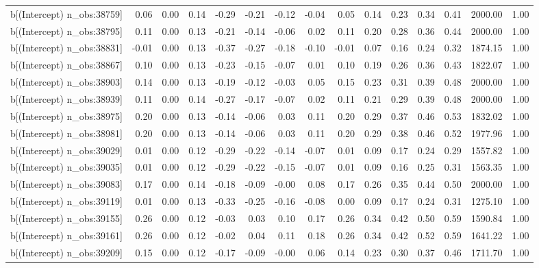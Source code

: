 \begin{table}[ht]
\begin{tabular}{rrrrrrrrrrrrrrr}
  b[(Intercept) n\_obs:38759] & 0.06 & 0.00 & 0.14 & -0.29 & -0.21 & -0.12 & -0.04 & 0.05 & 0.14 & 0.23 & 0.34 & 0.41 & 2000.00 & 1.00 \\ 
  b[(Intercept) n\_obs:38795] & 0.11 & 0.00 & 0.13 & -0.21 & -0.14 & -0.06 & 0.02 & 0.11 & 0.20 & 0.28 & 0.36 & 0.44 & 2000.00 & 1.00 \\ 
  b[(Intercept) n\_obs:38831] & -0.01 & 0.00 & 0.13 & -0.37 & -0.27 & -0.18 & -0.10 & -0.01 & 0.07 & 0.16 & 0.24 & 0.32 & 1874.15 & 1.00 \\ 
  b[(Intercept) n\_obs:38867] & 0.10 & 0.00 & 0.13 & -0.23 & -0.15 & -0.07 & 0.01 & 0.10 & 0.19 & 0.26 & 0.36 & 0.43 & 1822.07 & 1.00 \\ 
  b[(Intercept) n\_obs:38903] & 0.14 & 0.00 & 0.13 & -0.19 & -0.12 & -0.03 & 0.05 & 0.15 & 0.23 & 0.31 & 0.39 & 0.48 & 2000.00 & 1.00 \\ 
  b[(Intercept) n\_obs:38939] & 0.11 & 0.00 & 0.14 & -0.27 & -0.17 & -0.07 & 0.02 & 0.11 & 0.21 & 0.29 & 0.39 & 0.48 & 2000.00 & 1.00 \\ 
  b[(Intercept) n\_obs:38975] & 0.20 & 0.00 & 0.13 & -0.14 & -0.06 & 0.03 & 0.11 & 0.20 & 0.29 & 0.37 & 0.46 & 0.53 & 1832.02 & 1.00 \\ 
  b[(Intercept) n\_obs:38981] & 0.20 & 0.00 & 0.13 & -0.14 & -0.06 & 0.03 & 0.11 & 0.20 & 0.29 & 0.38 & 0.46 & 0.52 & 1977.96 & 1.00 \\ 
  b[(Intercept) n\_obs:39029] & 0.01 & 0.00 & 0.12 & -0.29 & -0.22 & -0.14 & -0.07 & 0.01 & 0.09 & 0.17 & 0.24 & 0.29 & 1557.82 & 1.00 \\ 
  b[(Intercept) n\_obs:39035] & 0.01 & 0.00 & 0.12 & -0.29 & -0.22 & -0.15 & -0.07 & 0.01 & 0.09 & 0.16 & 0.25 & 0.31 & 1563.35 & 1.00 \\ 
  b[(Intercept) n\_obs:39083] & 0.17 & 0.00 & 0.14 & -0.18 & -0.09 & -0.00 & 0.08 & 0.17 & 0.26 & 0.35 & 0.44 & 0.50 & 2000.00 & 1.00 \\ 
  b[(Intercept) n\_obs:39119] & 0.01 & 0.00 & 0.13 & -0.33 & -0.25 & -0.16 & -0.08 & 0.00 & 0.09 & 0.17 & 0.24 & 0.31 & 1275.10 & 1.00 \\ 
  b[(Intercept) n\_obs:39155] & 0.26 & 0.00 & 0.12 & -0.03 & 0.03 & 0.10 & 0.17 & 0.26 & 0.34 & 0.42 & 0.50 & 0.59 & 1590.84 & 1.00 \\ 
  b[(Intercept) n\_obs:39161] & 0.26 & 0.00 & 0.12 & -0.02 & 0.04 & 0.11 & 0.18 & 0.26 & 0.34 & 0.42 & 0.52 & 0.59 & 1641.22 & 1.00 \\ 
  b[(Intercept) n\_obs:39209] & 0.15 & 0.00 & 0.12 & -0.17 & -0.09 & -0.00 & 0.06 & 0.14 & 0.23 & 0.30 & 0.37 & 0.46 & 1711.70 & 1.00 \\ 

\end{tabular}
\end{table}
